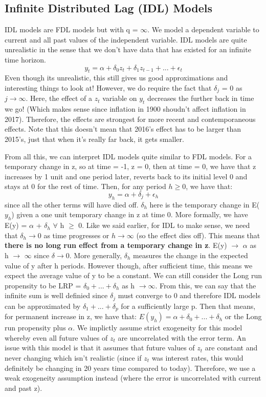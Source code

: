 \documentclass[11pt, oneside]{article}
\theoremstyle{definition}
\begin{document}
\subsection{Infinite Distributed Lag (IDL) Models}
IDL models are FDL models but with q = $\infty$. We model a dependent variable to current and all past values of the independent variable. IDL models are quite unrealistic in the sense that we don't have data that has existed for an infinite time horizon.
$$
y_t = \alpha + \delta_0 z_t + \delta_1 z_{t-1} + ... + \epsilon_t
$$
Even though its unrealistic, this still gives us good approximations and interesting things to look at! However, we do require the fact that $\delta_j$ = 0 as $j \rightarrow \infty$. Here, the effect of a $z_{t}$ variable on $y_t$ decreases the further back in time we go! (Which makes sense since inflation in 1900 shoudn't affect inflation in 2017). Therefore, the effects are strongest for more recent and contemporaneous effects. Note that this doesn't mean that 2016's effect has to be larger than 2015's, just that when it's really far back, it gets smaller.

From all this, we can interpret IDL models quite similar to FDL models. For a temporary change in z, so at time = -1, z = 0, then at time = 0, we have that z increases by 1 unit and one period later, reverts back to its initial level 0 and stays at 0 for the rest of time. Then, for any period $h \geq 0$, we have that:
$$
y_h = \alpha + \delta_j + \epsilon_h
$$
since all the other terms will have died off. $\delta_h$ here is the temporary change in E($y_h$) given a one unit temporary change in z at time 0. More formally, we have E(y) = $\alpha$ + $\delta_h$ $\forall$ h $\geq$ 0. Like we said earlier, for IDL to make sense, we need that $\delta_h \rightarrow 0$ as time progresses or $h \rightarrow \infty$ (so the effect dies off). This means that \textbf{there is no long run effect from a temporary change in z}. E(y) $\rightarrow$ $\alpha$ as h $\rightarrow$ $\infty$ since $\delta \rightarrow 0$. More generally, $\delta_h$ measures the change in the expected value of y after h periods. However though, after sufficient time, this means we expect the average value of y to be a constant. We can still consider the Long run propensity to be LRP = $\delta_0 + ... + \delta_h$ as h $\rightarrow \infty$. From this, we can say that the infinite sum is well definied since $\delta_j$ must converge to 0 and therefore IDL models can be approximated by $\delta_1 + ... + \delta_p$ for a sufficiently large p. Then that means, for permanent increase in z, we have that: $E(y_h) = \alpha + \delta_0 +...+\delta_h$ or the Long run propensity plus $\alpha$. We implictly assume strict exogeneity for this model whereby even all future values of $z_t$ are uncorrelated with the error term. An issue with this model is that it assumes that future values of $z_t$ are constant and never changing which isn't realistic (since if $z_t$ was interest rates, this would definitely be changing in 20 years time compared to today). Therefore, we use a weak exogeneity assumption instead (where the error is uncorrelated with current and past z).
\end{document}
